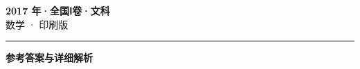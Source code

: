 \documentclass[zihao=5, a4paper]{ctexart}
\begin{document}
\begin{center}
  {\Large\bfseries 2017 年·全国Ⅰ卷·文科}\\[4pt]
  {\large 数学 · 印刷版}
\end{center}
\medskip
{}

\par\bigskip\hrule\bigskip
{}
\begin{center}{\large\bfseries 参考答案与详细解析}\end{center}
\smallskip

\end{document}
